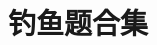 \documentclass[../main.tex]{subfiles} %
\begin{document}
\chapter{钓鱼题合集}



% 

% 

% 

% 

% 

% 

% 

% 

% 
\end{document}

